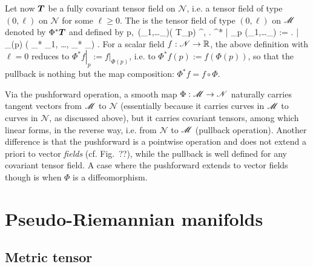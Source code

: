 Let now $\bm{T}$ be a fully covariant tensor field on $\mathscr{N}$, i.e. a tensor field
of type $(0,\ell)$ on $\mathscr{N}$ for some $\ell \geq 0$. The
is the tensor field of type $(0,\ell)$ on $\mathscr{M}$ denoted by
$\Phi^*\bm{T}$ and
defined by
\be \label{e:bas:def_pullback}
    \forall p\in\M,\
    \forall (_1,\ldots{}_\ell)\in \left( T_p\M \right) ^\ell,\quad
    \left. \Phi^*  \right| _p (_1,\ldots\w{v}_\ell) := \left. \w{T} \right| _{\Phi(p)}
    \left( \Phi_* \w{v}_1, \ldots, \Phi_* \w{v}_\ell \right) .
\ee
For a scalar field $f: \mathscr{N}\to \mathbb{R}$, the above definition with $\ell = 0$ reduces
to $\left. \Phi^* f \right| _p := \left. f \right| _{\Phi(p)}$,
i.e. to $ \Phi^* f(p) := f(\Phi(p))$, so that
the pullback is nothing but the map composition:
$\Phi^* f = f \circ \Phi$.

\begin{remark} \label{r:bas:comp_push_pull}
Via the pushforward operation,
a smooth map $\Phi : \mathscr{M} \to \mathscr{N}$ naturally carries tangent vectors from $\mathscr{M}$ to $\mathscr{N}$
(essentially because it carries curves in $\mathscr{M}$ to curves in $\mathscr{N}$, as discussed above), but
it carries covariant tensors, among which linear forms, in the reverse way, i.e. from
$\mathscr{N}$ to $\mathscr{M}$ (pullback operation). Another difference is that
the pushforward is a pointwise operation and does not extend a priori to vector \emph{fields}
(cf. Fig.~??),
while the pullback is well defined for any covariant tensor field. A case where the
pushforward extends to vector fields though is when $\Phi$ is a diffeomorphism.
\end{remark}



\section{Pseudo-Riemannian manifolds} \label{s:bas:pRiemManif}

\subsection{Metric tensor} \label{s:bas:metric}

